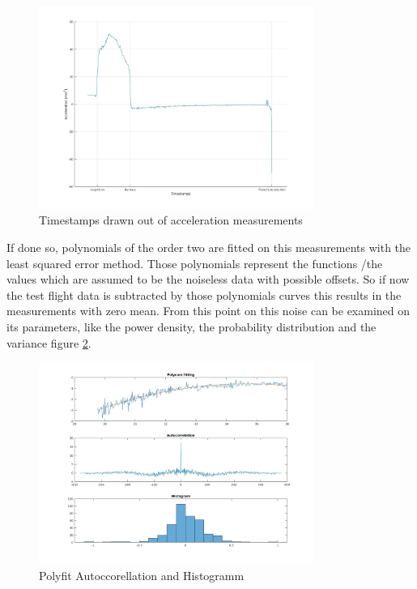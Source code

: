 \begin{figure}[h!]
 \centering
 \includegraphics[width=0.8\textwidth]{./Pictures/AccelerationMarks.jpg}
 \caption{Timestamps drawn out of acceleration measurements}
 \label{fig:AccelerationMarks}
\end{figure}


If done so, polynomials of the order two are fitted on this measurements with the least squared error method.
Those polynomials represent the functions /the values which are assumed to be the noiseless data with possible offsets.
So if now the test flight data is subtracted by those polynomials curves this results in the measurements with zero mean.
From this point on this noise can be examined on its parameters, like the power density, the probability distribution and the variance figure \ref{fig:PF_AC_HIST_Accel}.

\begin{figure}[h!]
 \centering
 \includegraphics[width=0.8\textwidth]{./Pictures/PF_AC_HIST_Accel.jpg}
 \caption{Polyfit Autoccorellation and Histogramm}
 \label{fig:PF_AC_HIST_Accel}
\end{figure}


